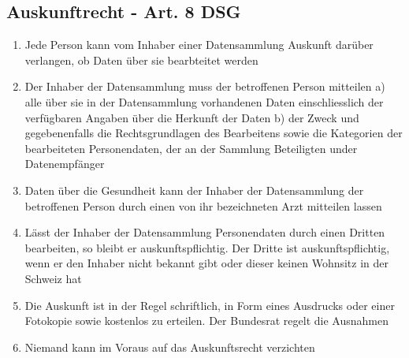 \documentclass{report}
\theoremstyle{definition}
\theoremstyle{example}
\begin{document}
\subsection{Auskunftrecht - Art. 8 DSG}
\begin{enumerate}
   \item Jede Person kann vom Inhaber einer Datensammlung Auskunft darüber verlangen, ob Daten über sie bearbteitet werden
   \item Der Inhaber der Datensammlung muss der betroffenen Person mitteilen
   \subitem a) alle über sie in der Datensammlung vorhandenen Daten einschliesslich der verfügbaren Angaben über die Herkunft der Daten
   \subitem b) der Zweck und gegebenenfalls die Rechtsgrundlagen des Bearbeitens sowie die Kategorien der bearbeiteten Personendaten, der an der Sammlung Beteiligten under Datenempfänger
   \item Daten über die Gesundheit kann der Inhaber der Datensammlung der betroffenen Person durch einen von ihr bezeichneten Arzt mitteilen lassen
   \item Lässt der Inhaber der Datensammlung Personendaten durch einen Dritten bearbeiten, so bleibt er auskunftspflichtig. Der Dritte ist auskunftspflichtig, wenn er den Inhaber nicht bekannt gibt oder dieser keinen Wohnsitz in der Schweiz hat
   \item Die Auskunft ist in der Regel schriftlich, in Form eines Ausdrucks oder einer Fotokopie sowie kostenlos zu erteilen. Der Bundesrat regelt die Ausnahmen
   \item Niemand kann im Voraus auf das Auskunftsrecht verzichten
\end{enumerate}
\end{document}
